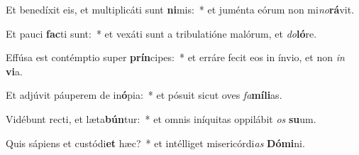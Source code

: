 \item Et benedíxit eis, et multiplicáti sunt \textbf{ni}mis:~* et juménta eórum non mi\textit{no}\textbf{rá}vit.
\item Et pauci \textbf{fac}ti sunt:~* et vexáti sunt a tribulatióne malórum, et \textit{do}\textbf{ló}re.
\item Effúsa est contémptio super \textbf{prín}cipes:~* et erráre fecit eos in ínvio, et non \textit{in} \textbf{vi}a.
\item Et adjúvit páuperem de in\textbf{ó}pia:~* et pósuit sicut oves \textit{fa}\textbf{mí}\textbf{li}as.
\item Vidébunt recti, et læta\textbf{bún}tur:~* et omnis iníquitas oppilábit \textit{os} \textbf{su}um.
\item Quis sápiens et custódi\textbf{et} hæc?~* et intélliget misericórdi\textit{as} \textbf{Dó}\textbf{mi}ni.
